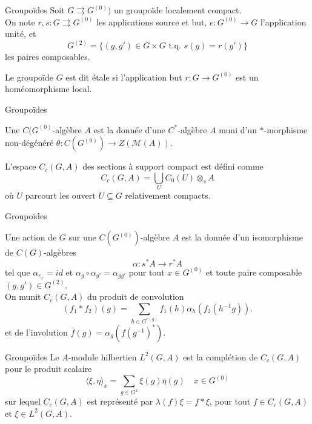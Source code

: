 \begin{frame}{Groupoïdes}
Soit $G \rightrightarrows G^{(0)}) $ un groupoïde localement compact.\\
\vspace{0.3 cm}
On note $r,s:G \rightrightarrows G^{(0)}$ les applications source et but, $e : G^{(0)} \rightarrow G$ l'application unité, et 
\[G^{(2)} = \{(g,g') \in G\times G \text{ t.q. } s(g)=r(g')\}\]
les paires composables.\\
\vspace{0.3 cm}
\begin{definitionfr}
Le groupoïde $G$ est dit étale si l'application but $r : G \rightarrow G^{(0)} $ est un homéomorphisme local.
\end{definitionfr}

\end{frame}

\begin{frame}{Groupoïdes}

Une $C(G^{(0)}$-algèbre $A$ est la donnée d'une $C^*$-algèbre $A$ muni d'un $*$-morphisme non-dégénéré $\theta : C(G^{(0)}) \rightarrow Z(\mathcal M(A))$.\\ 

\begin{definitionfr}
L'espace $C_c(G,A)$ des sections à support compact est défini comme
\[C_c(G,A) = \bigcup_U C_0(U)\otimes_s A\]
où $U$ parcourt les ouvert $U\subseteq G$ relativement compacts.
\end{definitionfr}

\end{frame}

\begin{frame}{Groupoïdes}

Une action de $G$ sur une $C(G^{(0)})$-algèbre $A$ est la donnée d'un isomorphisme de $C(G)$-algèbres 
\[\alpha : s^* A \rightarrow r^* A\]
tel que $\alpha_{e_x} = id$ et $\alpha_g \circ \alpha_{g'}  = \alpha_{gg'}$ pour tout $x\in G^{(0)}$ et toute paire composable $(g,g') \in G^{(2)}$.\\ 
\vspace{0.3 cm}
On munit $C_c(G,A)$ du produit de convolution 
\[(f_1\ast f_2)(g) = \sum_{h\in G^{r(g)}} f_1(h) \alpha_h(f_2(h^{-1}g)).\]
et de l'involution $\overline f(g)=\alpha_g(f(g^{-1})^*)$.\\

\end{frame}

\begin{frame}{Groupoïdes}
Le $A$-module hilbertien $L^2(G,A)$ est la complétion de $C_c(G,A)$ pour le produit scalaire 
\[\langle \xi ,\eta \rangle_x  = \sum_{g\in G^x} \xi(g)\overline \eta(g) \quad x\in G^{(0)} \]
sur lequel $C_c(G,A)$ est représenté par $\lambda(f) \xi = f\ast \xi$, pour tout $ f\in C_c(G,A)$ et $\xi\in L^2(G,A)$.\\
\end{frame}

